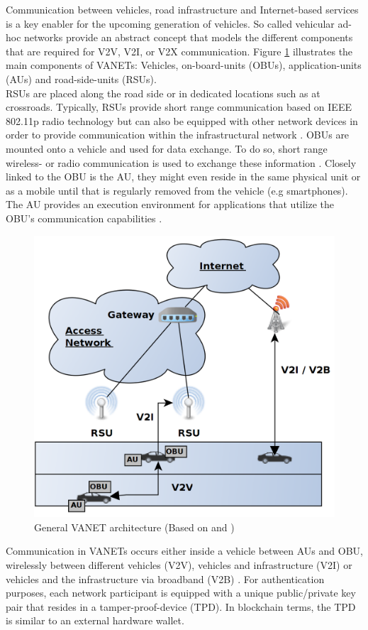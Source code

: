 \documentclass{llncs}
\begin{document}
{			Communication between vehicles, road infrastructure and Internet-based services is a key enabler for the upcoming generation of vehicles. So called vehicular ad-hoc networks provide an abstract concept that models the different components that are required for V2V, V2I, or V2X communication. Figure \ref{fig:vanets} illustrates the main components of VANETs: Vehicles, on-board-units (OBUs), application-units (AUs) and road-side-units (RSUs).\\
			RSUs are placed  along the road side or in dedicated locations such as at crossroads. Typically, RSUs provide short range communication based on IEEE 802.11p radio technology but can also be equipped with other network devices in order to provide communication within the infrastructural network \cite{al2014comprehensive}. OBUs are mounted onto a vehicle and used for data exchange. To do so, short range wireless- or radio communication is used to exchange these information \cite{baldessari2007car}. Closely linked to the OBU is the AU, they might even reside in the same physical unit or as a mobile until that is regularly removed from the vehicle (e.g smartphones). The AU provides an execution environment for applications that utilize the OBU's communication capabilities \cite{al2014comprehensive}\cite{baldessari2007car}.\\	
			\begin{figure}[ht]
				\centering
				\includegraphics[scale=0.2]{Figures/Vanets.png}
				\caption{General VANET architecture (Based on \protect\cite{baldessari2007car} and \cite{leiding2016self})}
				\label{fig:vanets}
			\end{figure}			
			Communication in VANETs occurs either inside a vehicle between AUs and OBU, wirelessly between different vehicles (V2V), vehicles and infrastructure (V2I) or vehicles and the infrastructure via broadband (V2B) \cite{faezipour2012progress}. For authentication purposes, each network participant is equipped with a unique public/private key pair that resides in a tamper-proof-device (TPD). In blockchain terms, the TPD is similar to an external hardware wallet.

}
\end{document}

